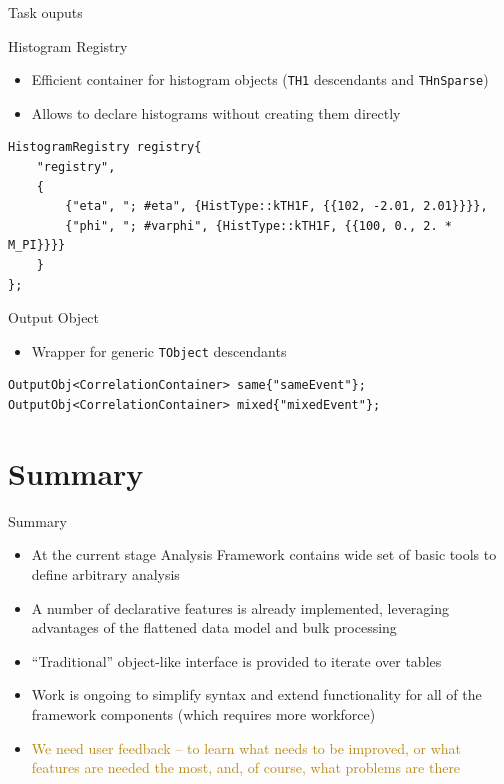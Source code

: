 \documentclass[10pt,lualatex,xcolor={table,svgnames},{hyperref={bookmarks=true,linktoc=all}},aspectratio=169]{beamer}
\begin{document}
\begin{frame}[fragile]{Task ouputs}
    \begin{block}{Histogram Registry}
        \begin{itemize}
            \item Efficient container for histogram objects (\texttt{TH1} descendants and \texttt{THnSparse})
            \item Allows to declare histograms without creating them directly
        \end{itemize}
        \begin{verbatim}
HistogramRegistry registry{
    "registry",
    {
        {"eta", "; #eta", {HistType::kTH1F, {{102, -2.01, 2.01}}}},
        {"phi", "; #varphi", {HistType::kTH1F, {{100, 0., 2. * M_PI}}}}
    }
};
        \end{verbatim}
    \end{block}
    \begin{block}{Output Object}
        \begin{itemize}
            \item Wrapper for generic \texttt{TObject} descendants
        \end{itemize}
\begin{verbatim}
OutputObj<CorrelationContainer> same{"sameEvent"};
OutputObj<CorrelationContainer> mixed{"mixedEvent"};
\end{verbatim}
    \end{block}
\end{frame}
\section{Summary}

\begin{frame}{Summary}
\begin{itemize}
    \item At the current stage Analysis Framework contains wide set of basic tools to define arbitrary analysis
    \item A number of declarative features is already implemented, leveraging advantages of the flattened data model and bulk processing
    \item \enquote{Traditional} object-like interface is provided to iterate over tables
    \item Work is ongoing to simplify syntax and extend functionality for all of the framework components (which requires more workforce)
    \item \textcolor{DarkGoldenrod}{We need user feedback -- to learn what needs to be improved, or what features are needed the most, and, of course, what problems are there}
\end{itemize}
\end{frame}
\end{document}
